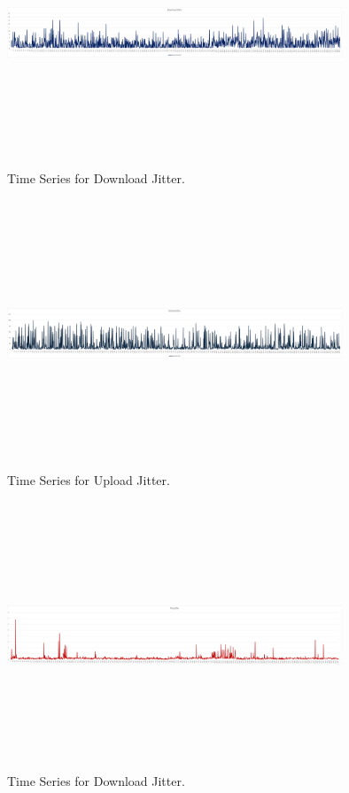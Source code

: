 \documentclass[conference]{IEEEtran}
\begin{document}
\begin{figure}[htbp]
    \centerline{\includegraphics[width=10cm,height=8cm,keepaspectratio]{Figures/Picture19.png}}
    \caption{Time Series for Download Jitter.}
    \label{fig10}
\end{figure}

\begin{figure}[htbp]
    \centerline{\includegraphics[width=10cm,height=8cm,keepaspectratio]{Figures/Picture20.png}}
    \caption{Time Series for Upload Jitter.}
    \label{fig11}
\end{figure}

\begin{figure}[htbp]
    \centerline{\includegraphics[width=10cm,height=8cm,keepaspectratio]{Figures/Picture21.png}}
    \caption{Time Series for Download Jitter.}
    \label{fig12}
\end{figure}
\end{document}
